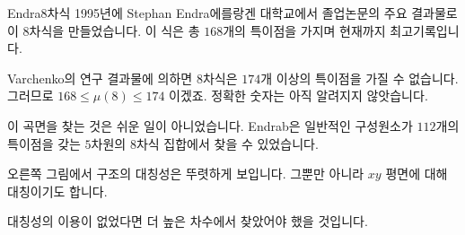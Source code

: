 \begin{surferPage}[Endraß의 $8$차식]{Endra $8$차식}
     1995년에 Stephan Endra 에를랑겐 대학교에서 졸업논문의 주요 결과물로 이 $8$차식을 만들었습니다. 이 식은 총 $168$개의 특이점을 가지며 현재까지 최고기록입니다.

    Varchenko의 연구 결과물에 의하면 $8$차식은 $174$개 이상의 특이점을 가질 수 없습니다. 그러므로 $168 \le \mu(8) \le 174$ 이겠죠. 정확한 숫자는 아직 알려지지 않앗습니다.

    이 곡면을 찾는 것은 쉬운 일이 아니었습니다. Endrab은 일반적인 구성원소가 $112$개의 특이점을 갖는 $5$차원의 $8$차식 집합에서 찾을 수 있었습니다. 
 

    오른쪽 그림에서 구조의 대칭성은 뚜렷하게 보입니다. 그뿐만 아니라 $xy$ 평면에 대해 대칭이기도 합니다. 

    대칭성의 이용이 없었다면 더 높은 차수에서 찾았어야 했을 것입니다.
\end{surferPage}
